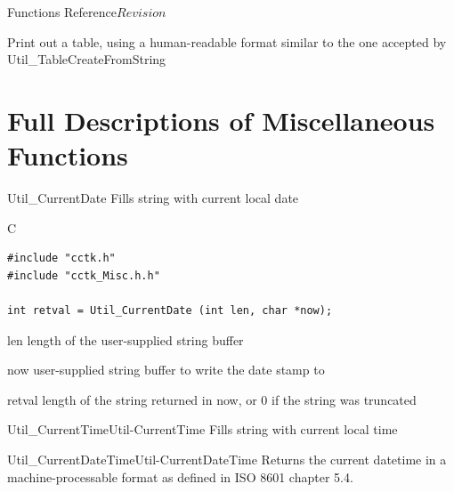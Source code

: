 \begin{cactuspart}{ Functions Reference}{}{$Revision$}
\begin{Lentry}
\item[\code{Util\_TablePrintPretty}]
     [\pageref{Util-TablePrintPretty}]
Print out a table, using a human-readable format similar to the one
accepted by Util\_TableCreateFromString

\end{Lentry}


\chapter{Full Descriptions of Miscellaneous Functions}

\begin{FunctionDescription}{Util\_CurrentDate}
\label{Util-CurrentDate}
Fills string with current local date

\begin{SynopsisSection}
\begin{Synopsis}{C}
\begin{verbatim}
#include "cctk.h"
#include "cctk_Misc.h.h"

int retval = Util_CurrentDate (int len, char *now);
\end{verbatim}
\end{Synopsis}
\end{SynopsisSection}

\begin{ParameterSection}
\begin{Parameter}{len}
length of the user-supplied string buffer 
\end{Parameter}
\begin{Parameter}{now}
user-supplied string buffer to write the date stamp to
\end{Parameter}
\end{ParameterSection}

\begin{ResultSection}
\begin{Result}{retval}
length of the string returned in {\code now}, or 0 if the string was truncated
\end{Result}
\end{ResultSection}

\begin{SeeAlsoSection}
\begin{SeeAlso2}{Util\_CurrentTime}{Util-CurrentTime}
  Fills string with current local time
\end{SeeAlso2}
\begin{SeeAlso2}{Util\_CurrentDateTime}{Util-CurrentDateTime}
  Returns the current datetime in a machine-processable format
  as defined in ISO 8601 chapter 5.4.
\end{SeeAlso2}
\end{SeeAlsoSection}


\end{FunctionDescription}
\end{cactuspart}
